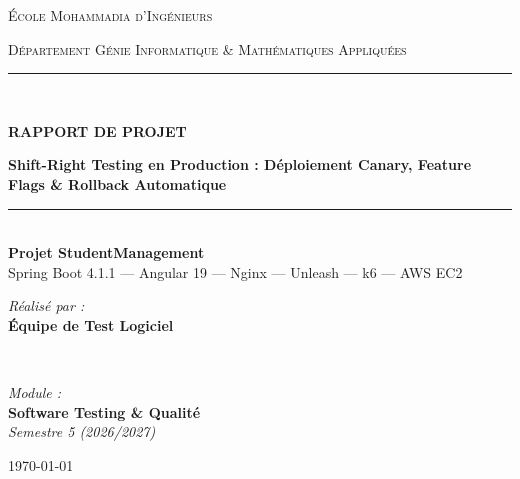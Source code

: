 \documentclass[12pt,a4paper]{article}
\begin{document}
\begin{titlepage}
    \centering
    \vspace*{0.5cm}
    {\scshape\LARGE École Mohammadia d'Ingénieurs \par}
    \vspace{0.3cm}
    {\scshape\Large Département Génie Informatique \& Mathématiques Appliquées\par}
    \vspace{1.5cm}

    \rule{\linewidth}{0.6mm} \\[0.4cm]
    {\huge\bfseries\color{primaryblue} RAPPORT DE PROJET \par}
    \vspace{0.3cm}
    {\LARGE\bfseries Shift-Right Testing en Production : Déploiement Canary, Feature Flags \& Rollback Automatique \par}
    \rule{\linewidth}{0.6mm} \\[1.5cm]

    \textbf{\Large Projet StudentManagement}\\[0.3cm]
    {\large Spring Boot 4.1.1 — Angular 19 — Nginx — Unleash — k6 — AWS EC2}\\[2.5cm]

    \begin{minipage}{0.48\textwidth}
        \begin{flushleft} \large
            \emph{Réalisé par :}\\
            \textbf{Équipe de Test Logiciel}
        \end{flushleft}
    \end{minipage}
    ~
    \begin{minipage}{0.48\textwidth}
        \begin{flushright} \large
            \emph{Module :}\\
            \textbf{Software Testing \& Qualité}\\
            \emph{Semestre 5 (2026/2027)}
        \end{flushright}
    \end{minipage}

    \vfill
    {\large \today \par}
\end{titlepage}

\tableofcontents
\newpage

\end{document}
